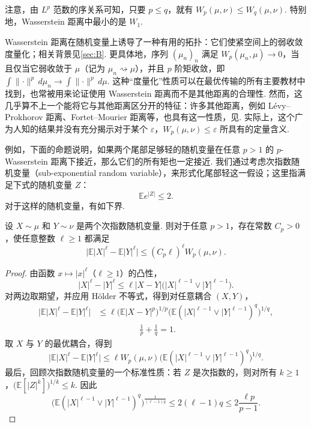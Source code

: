 注意，由 $L^p$ 范数的序关系可知，只要 $p\le q$，就有 $W_p(\mu,\nu)\le W_q(\mu,\nu)$. 特别地，Wasserstein 距离中最小的是 $W_1$.

Wasserstein 距离在随机变量上诱导了一种有用的拓扑：它们使紧空间上的弱收敛度量化；相关背景见\autoref{sec:B}. 更具体地，序列 $(\mu_n)_n$ 满足 $W_p(\mu_n,\mu)\to0$，当且仅当它弱收敛于 $\mu$（记为 $\mu_n\rightsquigarrow\mu$），并且 $p$ 阶矩收敛，即 $\int\lVert\cdot\rVert^p\,d\mu_n\to\int\lVert\cdot\rVert^p\,d\mu$. 这种“度量化”性质可以在最优传输的所有主要教材中找到，也常被用来论证使用 Wasserstein 距离而不是其他距离的合理性. 然而，这几乎算不上一个能将它与其他距离区分开的特征：许多其他距离，例如 L\'evy--Prokhorov 距离、Fortet--Mourier 距离等，也具有这一性质，见\cite[第 6 章]{ref317}. 实际上，这个广为人知的结果并没有充分揭示对于某个 $\varepsilon$，$W_p(\mu,\nu)\le\varepsilon$ 所具有的定量含义.

例如，下面的命题说明，如果两个尾部足够轻的随机变量在任意 $p>1$ 的 $p$-Wasserstein 距离下接近，那么它们的所有矩也一定接近. 我们通过考虑次指数随机变量（sub-exponential random variable），来形式化尾部轻这一假设；这里指满足下式的随机变量 $Z$：
\begin{equation}\label{eq:1.4}
\mathbb E e^{|Z|}\le2.
\end{equation}
对于这样的随机变量，有如下界.

\begin{proposition}\label{prop:1.5}
设 $X\sim\mu$ 和 $Y\sim\nu$ 是两个次指数随机变量. 则对于任意 $p>1$，存在常数 $C_p>0$，使任意整数 $\ell\ge1$ 都满足
$$
\bigl|\mathbb E|X|^\ell-\mathbb E|Y|^\ell\bigr|
\le(C_p\ell)^\ell W_p(\mu,\nu).
$$
\end{proposition}
\begin{proof}
由函数 $x\mapsto|x|^\ell$（$\ell\ge1$）的凸性，
$$
|X|^\ell-|Y|^\ell
\le\ell|X-Y|\bigl(|X|^{\ell-1}\vee|Y|^{\ell-1}\bigr).
$$
对两边取期望，并应用 H\"older 不等式，得到对任意耦合 $(X,Y)$，
$$
\begin{aligned}
\bigl|\mathbb E|X|^\ell-\mathbb E|Y|^\ell\bigr|
&\le\ell\bigl(\mathbb E|X-Y|^p\bigr)^{1/p}
\bigl(\mathbb E(|X|^{\ell-1}\vee|Y|^{\ell-1})^q\bigr)^{1/q},\\
&\hspace{5em}\frac1p+\frac1q=1.
\end{aligned}
$$
取 $X$ 与 $Y$ 的最优耦合，得到
$$
\bigl|\mathbb E|X|^\ell-\mathbb E|Y|^\ell\bigr|
\le\ell W_p(\mu,\nu)
\bigl(\mathbb E(|X|^{\ell-1}\vee|Y|^{\ell-1})^q\bigr)^{1/q}.
$$
最后，回顾次指数随机变量的一个标准性质\cite{ref314}：若 $Z$ 是次指数的，则对所有 $k\ge1$，$\bigl(\mathbb E[|Z|^k]\bigr)^{1/k}\le k$. 因此
$$
\bigl(\mathbb E(|X|^{\ell-1}\vee|Y|^{\ell-1})^q\bigr)^{\frac1{(\ell-1)q}}
\le2(\ell-1)q\le2\frac{\ell p}{p-1}.
$$
\end{proof}

